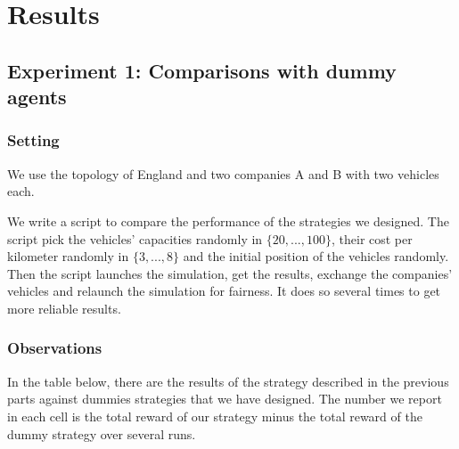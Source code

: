 \documentclass[11pt]{article}
\begin{document}

\section{Results}

\subsection{Experiment 1: Comparisons with dummy agents}

\subsubsection{Setting}

We use the topology of England and two companies A and B with two vehicles each. 

We write a script to compare the performance of the strategies we designed.
The script pick the vehicles' capacities randomly in $\{20, ..., 100\}$, their cost per kilometer randomly in $\{3, ..., 8\}$ and the initial position of the vehicles randomly. Then the script launches the simulation, get the results, exchange the companies' vehicles and relaunch the simulation for fairness. It does so several times to get more reliable results.

\subsubsection{Observations}

In the table below, there are the results of the strategy described in the previous parts against dummies strategies that we have designed. The number we report in each cell is the total reward of our strategy minus the total reward of the dummy strategy over several runs.
\end{document}

